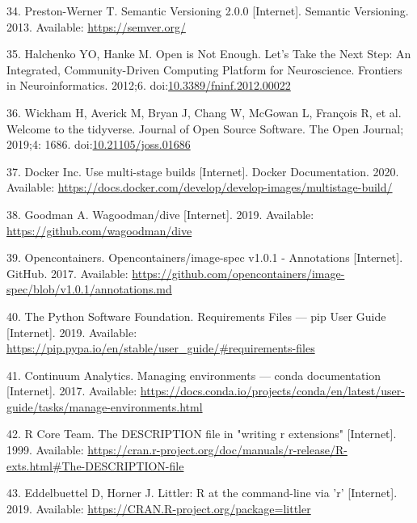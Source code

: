 \documentclass[10pt,letterpaper]{article}
\begin{document}
\leavevmode\hypertarget{ref-preston-werner_semantic_2013}{}%
34. Preston-Werner T. Semantic Versioning 2.0.0 {[}Internet{]}. Semantic
Versioning. 2013. Available: \url{https://semver.org/}

\leavevmode\hypertarget{ref-halchenko_open_2012}{}%
35. Halchenko YO, Hanke M. Open is Not Enough. Let's Take the Next Step:
An Integrated, Community-Driven Computing Platform for Neuroscience.
Frontiers in Neuroinformatics. 2012;6.
doi:\href{https://doi.org/10.3389/fninf.2012.00022}{10.3389/fninf.2012.00022}

\leavevmode\hypertarget{ref-Wickham2019}{}%
36. Wickham H, Averick M, Bryan J, Chang W, McGowan L, François R, et
al. Welcome to the tidyverse. Journal of Open Source Software. The Open
Journal; 2019;4: 1686.
doi:\href{https://doi.org/10.21105/joss.01686}{10.21105/joss.01686}

\leavevmode\hypertarget{ref-docker_multi-stage_2020}{}%
37. Docker Inc. Use multi-stage builds {[}Internet{]}. Docker
Documentation. 2020. Available:
\url{https://docs.docker.com/develop/develop-images/multistage-build/}

\leavevmode\hypertarget{ref-goodman_dive_2019}{}%
38. Goodman A. Wagoodman/dive {[}Internet{]}. 2019. Available:
\url{https://github.com/wagoodman/dive}

\leavevmode\hypertarget{ref-opencontainers_image-spec_2017}{}%
39. Opencontainers. Opencontainers/image-spec v1.0.1 - Annotations
{[}Internet{]}. GitHub. 2017. Available:
\url{https://github.com/opencontainers/image-spec/blob/v1.0.1/annotations.md}

\leavevmode\hypertarget{ref-the_python_software_foundation_requirements_2019}{}%
40. The Python Software Foundation. Requirements Files --- pip User
Guide {[}Internet{]}. 2019. Available:
\url{https://pip.pypa.io/en/stable/user_guide/\#requirements-files}

\leavevmode\hypertarget{ref-continuum_analytics_managing_2017}{}%
41. Continuum Analytics. Managing environments --- conda documentation
{[}Internet{]}. 2017. Available:
\url{https://docs.conda.io/projects/conda/en/latest/user-guide/tasks/manage-environments.html}

\leavevmode\hypertarget{ref-r_core_team_description_1999}{}%
42. R Core Team. The DESCRIPTION file in "writing r extensions"
{[}Internet{]}. 1999. Available:
\url{https://cran.r-project.org/doc/manuals/r-release/R-exts.html\#The-DESCRIPTION-file}

\leavevmode\hypertarget{ref-eddelbuettel_littler_2019}{}%
43. Eddelbuettel D, Horner J. Littler: R at the command-line via 'r'
{[}Internet{]}. 2019. Available:
\url{https://CRAN.R-project.org/package=littler}
\end{document}
